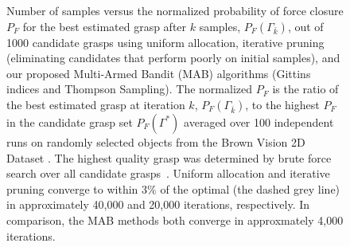 \documentclass[10pt, conference]{ieeeconf}      %
\begin{document}
\begin{figure}
    \caption{Number of samples versus the normalized probability of force closure $P_F$ for the best estimated grasp after $k$ samples, $P_F(\Gamma_{\bar{k}})$, out of 1000 candidate grasps using uniform allocation, iterative pruning (eliminating candidates that perform poorly on initial samples), and our proposed Multi-Armed Bandit (MAB) algorithms (Gittins indices and Thompson Sampling).
    The normalized $P_F$ is the ratio of the best estimated grasp at iteration $k$, $P_F(\Gamma_{\bar{k}})$, to the highest $P_F$ in the candidate grasp set $P_F(\Gamma^*)$ averaged over 100 independent runs on randomly selected objects from the Brown Vision 2D Dataset \cite{brown}.
    The highest quality grasp was determined by brute force search over all candidate grasps~\cite{kehoe2012toward}.
    Uniform allocation and iterative pruning converge to within 3$\%$ of the optimal (the dashed grey line) in approximately 40,000 and 20,000 iterations, respectively.
    In comparison, the MAB methods both converge in approxmately 4,000 iterations. 
%    
	}
    \label{fig:grasp_quality}
\end{figure}
\end{document}
